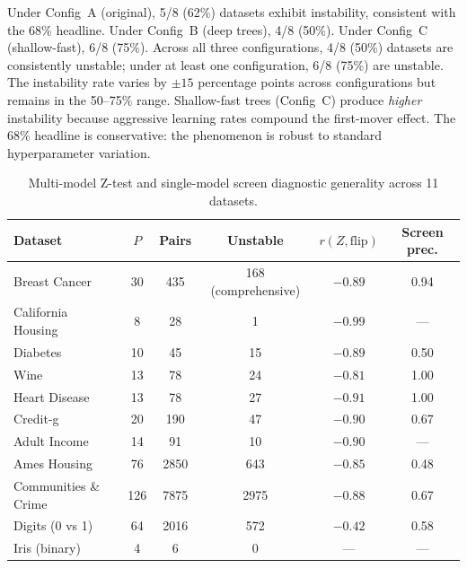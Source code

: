 \documentclass{article}
\begin{document}
Under Config~A (original), 5/8 (62\%) datasets exhibit instability, consistent with the 68\% headline. Under Config~B (deep trees), 4/8 (50\%). Under Config~C (shallow-fast), 6/8 (75\%). Across all three configurations, 4/8 (50\%) datasets are consistently unstable; under at least one configuration, 6/8 (75\%) are unstable. The instability rate varies by $\pm 15$ percentage points across configurations but remains in the 50--75\% range. Shallow-fast trees (Config~C) produce \emph{higher} instability because aggressive learning rates compound the first-mover effect. The 68\% headline is conservative: the phenomenon is robust to standard hyperparameter variation.

\begin{table}[t]
\centering
\caption{Multi-model Z-test and single-model screen diagnostic generality across 11 datasets.}
\label{tab:f1-generality}
\small
\begin{tabular}{@{}lccccc@{}}
\toprule
Dataset & $P$ & Pairs & Unstable & $r(Z, \text{flip})$ & Screen prec. \\
\midrule
Breast Cancer & 30 & 435 & 168 (comprehensive) & $-0.89$ & 0.94 \\
California Housing & 8 & 28 & 1 & $-0.99$ & --- \\
Diabetes & 10 & 45 & 15 & $-0.89$ & 0.50 \\
Wine & 13 & 78 & 24 & $-0.81$ & 1.00 \\
Heart Disease & 13 & 78 & 27 & $-0.91$ & 1.00 \\
Credit-g & 20 & 190 & 47 & $-0.90$ & 0.67 \\
Adult Income & 14 & 91 & 10 & $-0.90$ & --- \\
Ames Housing & 76 & 2850 & 643 & $-0.85$ & 0.48 \\
Communities \& Crime & 126 & 7875 & 2975 & $-0.88$ & 0.67 \\
Digits (0 vs 1) & 64 & 2016 & 572 & $-0.42$ & 0.58 \\
Iris (binary) & 4 & 6 & 0 & --- & --- \\
\bottomrule
\end{tabular}
\end{table}
\end{document}
